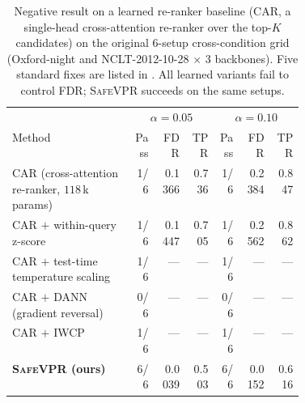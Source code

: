 \begin{table}[t]
\centering
\caption{Negative result on a learned re-ranker baseline (CAR, a single-head cross-attention re-ranker over the top-$K$ candidates) on the original $6$-setup cross-condition grid (Oxford-night and NCLT-2012-10-28 $\times$ $3$ backbones). Five standard fixes are listed in . All learned variants fail to control FDR; \textsc{SafeVPR} succeeds on the same setups.}
\label{tab:learned_reranker}
\scriptsize
\setlength{\tabcolsep}{2.5pt}
\begin{tabular}{p{0.42\linewidth} rrr rrr}
\toprule
& \multicolumn{3}{c}{$\alpha = 0.05$} & \multicolumn{3}{c}{$\alpha = 0.10$} \\
\cmidrule(lr){2-4}\cmidrule(lr){5-7}
Method & Pass & FDR & TPR & Pass & FDR & TPR \\
\midrule
  CAR (cross-attention re-ranker, $118$\,k params) & 1/6 & 0.1366 & 0.736 & 1/6 & 0.2384 & 0.847 \\
  CAR $+$ within-query z-score & 1/6 & 0.1447 & 0.705 & 1/6 & 0.2562 & 0.862 \\
  CAR $+$ test-time temperature scaling & 1/6 & — & — & 1/6 & — & — \\
  CAR $+$ DANN (gradient reversal) & 0/6 & — & — & 0/6 & — & — \\
  CAR $+$ IWCP~\cite{tibshirani2019conformal} & 1/6 & — & — & 1/6 & — & — \\
  \midrule
  \textbf{\textsc{SafeVPR} (ours)} & 6/6 & 0.0039 & 0.503 & 6/6 & 0.0152 & 0.616 \\
\bottomrule
\end{tabular}
\end{table}
